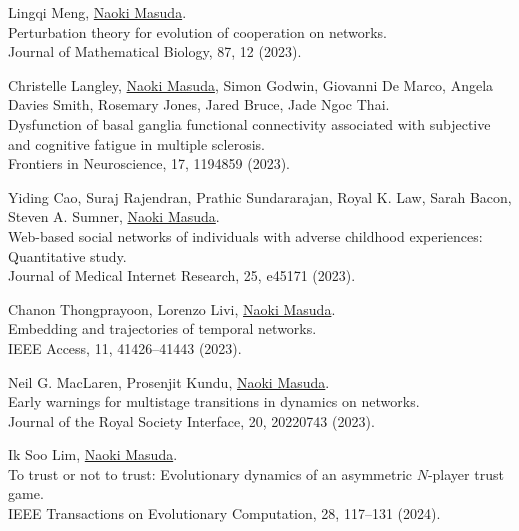 \documentclass[11pt,letter]{article}
\begin{document}
\begin{etaremune}
\item Lingqi Meng, \underline{Naoki Masuda}.\\
Perturbation theory for evolution of cooperation on networks.\\
Journal of Mathematical Biology, 87, 12 (2023).

\item Christelle Langley, \underline{Naoki Masuda}, Simon Godwin, Giovanni De Marco, Angela Davies Smith, Rosemary Jones, Jared Bruce, Jade Ngoc Thai.\\
Dysfunction of basal ganglia functional connectivity associated with subjective and cognitive fatigue in multiple sclerosis.\\
Frontiers in Neuroscience, 17, 1194859 (2023).

\item Yiding Cao, Suraj Rajendran, Prathic Sundararajan, Royal K. Law, Sarah Bacon, Steven A. Sumner, \underline{Naoki Masuda}.\\
Web-based social networks of individuals with adverse childhood experiences: Quantitative study.\\
Journal of Medical Internet Research, 25, e45171 (2023).


\item Chanon Thongprayoon, Lorenzo Livi, \underline{Naoki Masuda}.\\
Embedding and trajectories of temporal networks.\\
IEEE Access, 11, 41426--41443 (2023).
 
\item Neil G. MacLaren, Prosenjit Kundu, \underline{Naoki Masuda}.\\
Early warnings for multistage transitions in dynamics on networks.\\
Journal of the Royal Society Interface, 20, 20220743 (2023).

\item Ik Soo Lim, \underline{Naoki Masuda}.\\
To trust or not to trust: Evolutionary dynamics of an asymmetric $N$-player trust game.\\
IEEE Transactions on Evolutionary Computation, 28, 117--131 (2024).


\end{etaremune}
\end{document}

